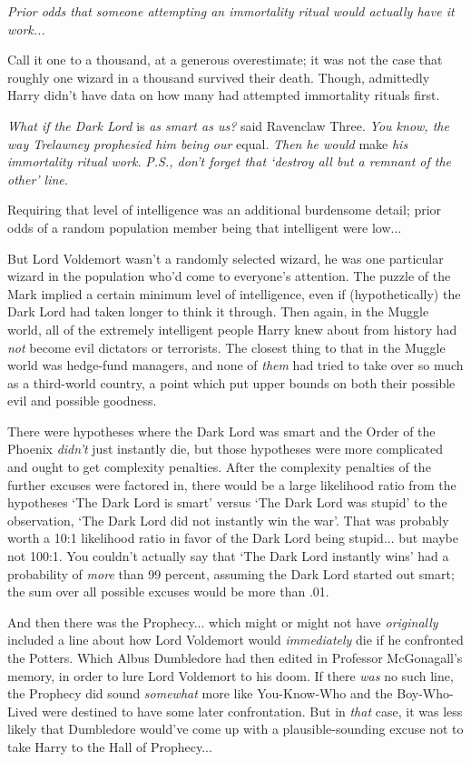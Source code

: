 \emph{Prior odds that someone attempting an immortality ritual would actually have it work...}

Call it one to a thousand, at a generous overestimate; it was not the case that roughly one wizard in a thousand survived their death. Though, admittedly Harry didn’t have data on how many had attempted immortality rituals first.

\emph{What if the Dark Lord} is \emph{as smart as us?} said Ravenclaw Three. \emph{You know, the way Trelawney prophesied him being our} equal. \emph{Then he would} make \emph{his immortality ritual work.} \emph{P.S., don’t forget that ‘destroy all but a remnant of the other’ line.}

Requiring that level of intelligence was an additional burdensome detail; prior odds of a random population member being that intelligent were low...

But Lord Voldemort wasn’t a randomly selected wizard, he was one particular wizard in the population who’d come to everyone’s attention. The puzzle of the Mark implied a certain minimum level of intelligence, even if (hypothetically) the Dark Lord had taken longer to think it through. Then again, in the Muggle world, all of the extremely intelligent people Harry knew about from history had \emph{not} become evil dictators or terrorists. The closest thing to that in the Muggle world was hedge-fund managers, and none of \emph{them} had tried to take over so much as a third-world country, a point which put upper bounds on both their possible evil and possible goodness.

There were hypotheses where the Dark Lord was smart and the Order of the Phoenix \emph{didn’t} just instantly die, but those hypotheses were more complicated and ought to get complexity penalties. After the complexity penalties of the further excuses were factored in, there would be a large likelihood ratio from the hypotheses ‘The Dark Lord is smart’ versus ‘The Dark Lord was stupid’ to the observation, ‘The Dark Lord did not instantly win the war’. That was probably worth a 10:1 likelihood ratio in favor of the Dark Lord being stupid... but maybe not 100:1. You couldn’t actually say that ‘The Dark Lord instantly wins’ had a probability of \emph{more} than 99 percent, assuming the Dark Lord started out smart; the sum over all possible excuses would be more than .01.

And then there was the Prophecy... which might or might not have \emph{originally} included a line about how Lord Voldemort would \emph{immediately} die if he confronted the Potters. Which Albus Dumbledore had then edited in Professor McGonagall’s memory, in order to lure Lord Voldemort to his doom. If there \emph{was} no such line, the Prophecy did sound \emph{somewhat} more like You-Know-Who and the Boy-Who-Lived were destined to have some later confrontation. But in \emph{that} case, it was less likely that Dumbledore would’ve come up with a plausible-sounding excuse not to take Harry to the Hall of Prophecy...

